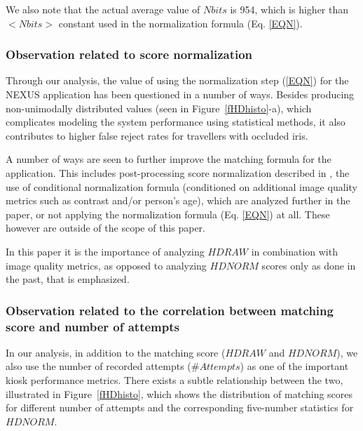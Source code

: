 \documentclass{cta-author}%
\begin{document}
We also note that the actual average value of $Nbits$ is 954, which is higher than $<Nbits>$ constant used in the normalization formula (Eq. \ref{EQN}).


\subsubsection{Observation related to score normalization }
\label{s.score.normalization}

Through our analysis, the value of using the normalization step (\ref{EQN}) for the NEXUS application has been questioned in a number of ways. Besides producing non-unimodally distributed values (seen in Figure~\ref{fHDhisto}-a), which complicates modeling the system performance using statistical methods, it also contributes to higher false reject rates for travellers with  occluded iris.

A number of ways are seen to further improve the matching formula for the application. This includes post-processing score normalization described in \cite{GorodnichyScore},  the use of conditional normalization formula (conditioned on additional image quality metrics such as contrast and/or person's age), which are analyzed further in the paper, or not applying the normalization formula (Eq. \ref{EQN}) at all. These however are outside of the scope of this paper. 

In this paper  it is the importance of analyzing $HDRAW$ in combination with image quality metrics, as opposed to analyzing  $HDNORM$ scores only as done in the past, that is emphasized. 


\subsubsection{Observation related to the correlation between matching score and number of attempts }
\label{s.HDvsAttm}


In our analysis, in addition to the matching score ($HDRAW$ and $HDNORM$), we also use the number of recorded attempts ($\# Attempts$) as one of the important kiosk performance metrics. 
There exists a subtle relationship between the two,  illustrated in Figure~\ref{fHDhisto}, which  
shows the distribution of matching scores for different number of attempts and the corresponding five-number statistics for $HDNORM$.%
\end{document}
